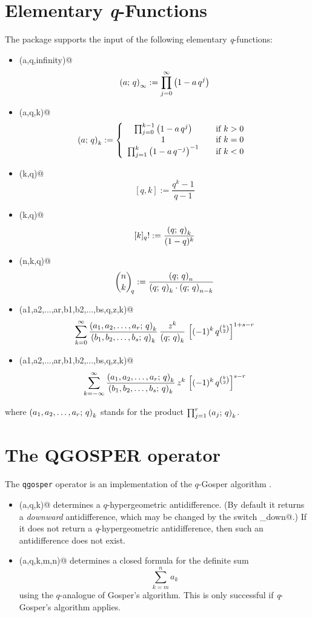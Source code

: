 \section{Elementary {\slshape q}-Functions}
The package supports the input of the following elementary 
{\slshape q}-functions:
\begin{itemize}

\item {\verb@qpochhammer(a,q,infinity)@}
	\[ \left(a;\,q\right)_{\infty}:= \prod_{j=0}^{\infty}{\left(1-a\,q^j\right)} \]
\item {\verb@qpochhammer(a,q,k)@}
	\[ \qfac{a}{k}:= \funkdefff{\prod_{j=0}^{k-1}{\left(1-a\,q^j\right)}}%
		{k>0}{1}{k=0}{\prod_{j=1}^{k}{\left(1-a\,q^{-j}\right)^{-1}}}{k<0}
	\]
\item {\verb@qbrackets(k,q)@}
	\[  {}[q,k]:=\frac{q^k-1}{q-1}  \]
\item {\verb@qfactorial(k,q)@}
	\[   {}[k]_q!:= \frac{\left(q;\,q\right)_{k}}{(1-q)^k}  \]
\item {\verb@qbinomial(n,k,q)@}
	\[  {{n \choose k}\!}_q:=
		\frac{\left(q;\,q\right)_{n}}{\left(q;\,q\right)_{k}\cdot\left(q;\,q\right)_{n-k}} \]
\item {\protect\verb@qphihyperterm({a1,a2,...,ar},{b1,b2,...,bs},q,z,k)@}
	\[ \sum_{k=0}^{\infty}{\frac{\left(a_1,a_2,\ldots,a_r;\,q\right)_{k}}
	{\left(b_1,b_2,\ldots,b_s;\,q\right)_{k}}
	\,\frac{z^k}{\left(q;\,q\right)_{k}}\,\left[(-1)^k\,
	q^{{k \choose 2}}\right]^{1+s-r}} \]

\item {\protect\verb@qpsihyperterm({a1,a2,...,ar},{b1,b2,...,bs},q,z,k)@}
        \[\sum_{k=-\infty}^{\infty}{\frac{\left(a_1,a_2,\ldots,a_r;\,q\right)_{k}}
	{\left(b_1,b_2,\ldots,b_s;\,q\right)_{k}}\,z^k\,
	\left[(-1)^k\,q^{{k \choose 2}}\right]^{s-r}} \]
\end{itemize}
where $\left(a_1,a_2,\ldots,a_r;\,q\right)_{k}$ stands for the
product $\prod_{j=1}^r{\left(a_j;\,q\right)_{k}}$.

\section{The {\ttfamily QGOSPER} operator}

The {\tt qgosper} operator is an implementation of the $q$-Gosper
algorithm \cite{Koornwinder:93}.
\begin{itemize}
	\item {\verb@qgosper(a,q,k)@} determines a $q$-hypergeometric
		antidifference. (By default it returns a {\sl downward}
		antidifference, which may be changed by the switch 
		{\verb@qgosper_down@}.)
		If it does not return a \textsl{q}-hypergeometric antidifference,
		then such an antidifference does not exist.
	\item {\verb@qgosper(a,q,k,m,n)@} determines a closed formula
		for the definite sum \[\sum\limits_{k=m}^n a_k\] using the
		$q$-analogue of Gosper's algorithm. 
		This is only successful if \textsl{q}-Gosper's algorithm applies.
\end{itemize}

